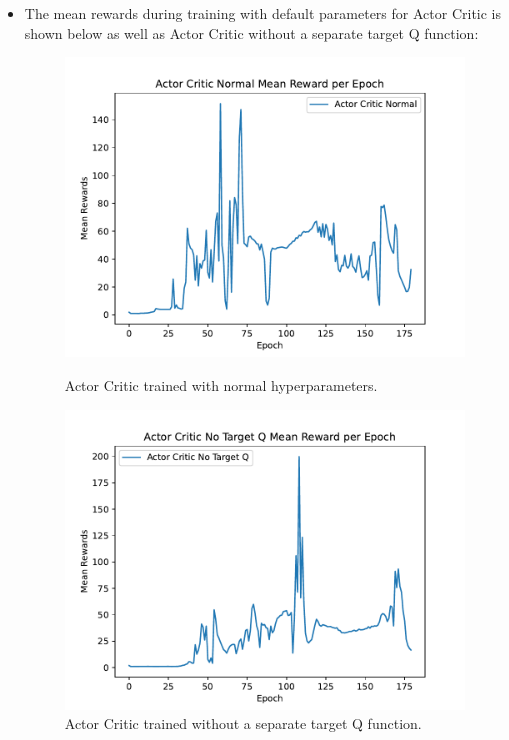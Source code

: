 \documentclass[12pt]{article}
\newcommand{\0}{\boldsymbol{0}}
\newcommand{\1}{\boldsymbol{1}}
\begin{document}
\begin{itemize}
    \item The mean rewards during training with default parameters for Actor Critic is shown below as well as Actor Critic without a separate target Q function:

    \begin{figure}[H]
        \centering
        \begin{minipage}{0.45\textwidth}
            \centering
            \includegraphics[width=1.0\linewidth]{../figs/ac_normal.pdf}
            \caption{Actor Critic trained with normal hyperparameters.}
            \label{fig:fig3}
        \end{minipage}
        \hspace{0.05\linewidth}
        \begin{minipage}{0.45\textwidth}
            \centering
            \includegraphics[width=1.0\linewidth]{../figs/ac_notarget.pdf}
            \caption{Actor Critic trained without a separate target Q function.}
            \label{fig:fig4}
        \end{minipage}
    \end{figure}


\end{itemize}
\end{document}
